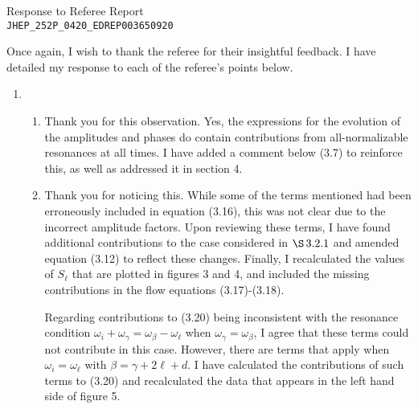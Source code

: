 \documentclass[11pt,letterpaper]{article}
\begin{document}
\vspace{.2in}
\begin{center}
    {\Large Response to Referee Report \\ \verb+JHEP_252P_0420_EDREP003650920+}  
\end{center}

\vspace{.25in}

Once again, I wish to thank the referee for their insightful feedback. I have detailed my response to each of the referee's points below.

\begin{enumerate}
    \item %
    \begin{enumerate}
        \item Thank you for this observation. Yes, the expressions for the evolution of the amplitudes and phases do contain contributions from all-normalizable resonances at all times. I have added a comment below (3.7) to reinforce this, as well as addressed it in section 4.
        \item Thank you for noticing this. While some of the terms mentioned had been erroneously included in equation (3.16), this was not clear due to the incorrect amplitude factors. Upon reviewing these terms, I have found additional contributions to the case considered in $\S\!~3.2.1$ and amended equation (3.12) to reflect these changes. Finally, I recalculated the values of $S_\ell$ that are plotted in figures 3 and 4, and included the missing contributions in the flow equations (3.17)-(3.18).
        
        Regarding contributions to (3.20) being inconsistent with the resonance condition $\omega_i + \omega_\gamma = \omega_\beta - \omega_\ell$ when $\omega_\gamma = \omega_\beta$, I agree that these terms could not contribute in this case. However, there are terms that apply when $\omega_i = \omega_\ell$ with $\beta = \gamma + 2\ell + d$. I have calculated the contributions of such terms to (3.20) and recalculated the data that appears in the left hand side of figure 5.
         

\end{enumerate}
\end{enumerate}
\end{document}
